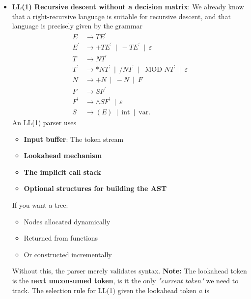 \documentclass{report}
\begin{document}
\begin{itemize}
        \item \textbf{LL(1) Recursive descent without a decision matrix}: 
            We already know that a right-recursive language is suitable for recursive descent, and that language is precisely given by the grammar
            \begin{align*}
                E &\to TE^{\prime} \\
                E^{\prime} &\to +TE^{\prime} \ \mid \ -TE^{\prime} \ \mid \ \varepsilon \\
                T &\to NT^{\prime} \\
                T^{\prime} &\to *NT^{\prime} \ \mid \ /NT^{\prime} \ \mid \ \text{ MOD } NT^{\prime} \ \mid \ \varepsilon \\
                N &\to +N \ \mid \ -N \ \mid \ F \\
                F &\to SF^{\prime} \\
                F^{\prime} &\to \land SF^{\prime} \ \mid \ \varepsilon\\
                S &\to (E) \ \mid \ \text{int} \ \mid \ \text{var}
            .\end{align*}
            An LL(1) parser uses 
            \begin{itemize}
                \item \textbf{Input buffer}: The token stream
                \item \textbf{Lookahead mechanism}
                \item \textbf{The implicit call stack}
                \item \textbf{Optional structures for building the AST}
            \end{itemize}
            If you want a tree:
            \begin{itemize}
                \item Nodes allocated dynamically
                \item Returned from functions
                \item Or constructed incrementally
            \end{itemize}
            Without this, the parser merely validates syntax.
            \bigbreak \noindent 
            \textbf{Note:} The lookahead token is the \textbf{next unconsumed token}, is it the only \textit{"current token"} we need to track.
            \bigbreak \noindent 
            The selection rule for LL(1) given the lookahead token $a$ is 
            \begin{enumerate}

\end{enumerate}
\end{itemize}
\end{document}
